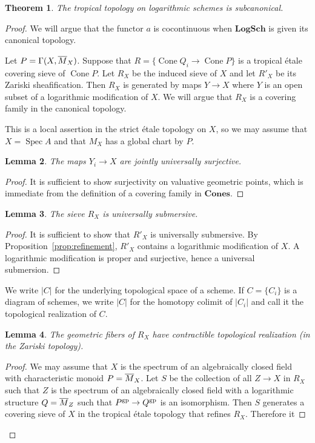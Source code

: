\documentclass[12pt]{amsart}
\newtheorem{theorem}{Theorem}
\newtheorem{lemma}[theorem]{Lemma}
\theoremstyle{definition}
\theoremstyle{remark}
\def\Cone{\operatorname{Cone}}
\def\Spec{\operatorname{Spec}}
\def\Cones{\mathbf{Cones}}
\def\LogSch{\mathbf{LogSch}}
\def\overnorm#1{\overline{#1}\vphantom{#1}}
\begin{document}
\begin{theorem} \label{thm:cocont}
The tropical topology on logarithmic schemes is subcanonical.
\end{theorem} 
\begin{proof}
We will argue that the functor $a$ is cocontinuous when $\LogSch$ is given its canonical topology.

Let $P = \Gamma(X, \overnorm M_X)$.  Suppose that $R = \{ \Cone Q_i \to \Cone P \}$ is a tropical \'etale covering sieve of $\Cone P$.  Let $R_X$ be the induced sieve of $X$ and let $R'_X$ be its Zariski sheafification.  Then $R_X$ is generated by maps $Y \to X$ where $Y$ is an open subset of a logarithmic modification of $X$.  We will argue that $R_X$ is a covering family in the canonical topology.

This is a local assertion in the strict \'etale topology on $X$, so we may assume that $X = \Spec A$ and that $M_X$ has a global chart by $P$.

\begin{lemma} \label{lem:surjective}
The maps $Y_i \to X$ are jointly universally surjective.
\end{lemma}
\begin{proof}
It is sufficient to show surjectivity on valuative geometric points, which is immediate from the definition of a covering family in $\Cones$.
\end{proof}

\begin{lemma} \label{lem:submersive}
The sieve $R_X$ is universally submersive.
\end{lemma}
\begin{proof}
It is sufficient to show that $R'_X$ is universally submersive.  By Proposition~\ref{prop:refinement}, $R'_X$ contains a logarithmic modification of $X$.  A logarithmic modification is proper and surjective, hence a universal submersion.
\end{proof}

We write $|C|$ for the underlying topological space of a scheme.  If $C = \{ C_i \}$ is a diagram of schemes, we write $|C|$ for the homotopy colimit of $|C_i|$ and call it the topological realization of $C$.

\begin{lemma} \label{lem:top-gpd}
The geometric fibers of $R_X$ have contractible topological realization (in the Zariski topology).
\end{lemma}
\begin{proof}
We may assume that $X$ is the spectrum of an algebraically closed field with characteristic monoid $P = \overnorm M_X$.  Let $S$ be the collection of all $Z \to X$ in $R_X$ such that $Z$ is the spectrum of an algebraically closed field with a logarithmic structure $Q = \overnorm M_Z$ such that $P^{\rm gp} \to Q^{\rm gp}$ is an isomorphism.  Then $S$ generates a covering sieve of $X$ in the tropical \'etale topology that refines $R_X$.  Therefore it 


\end{proof}
\end{proof}
\end{document}
